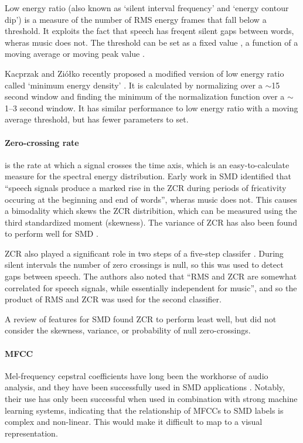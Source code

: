 Low energy ratio (also known as `silent interval frequency' and `energy contour
dip') is a measure of the number of RMS energy frames that fall below a
threshold. It exploits the fact that speech has freqent silent gaps between
words, wheras music does not. The threshold can be set as a fixed value
\citep{Liang2005}, a function of a moving average \citep{Ericsson2009} or moving
peak value \citep{Saunders1996}.

Kacprzak and Zi\'{o}\l{}ko recently proposed a modified version of low energy
ratio called `minimum energy density' \citep{Kacprzak2013}. It is calculated by
normalizing over a $\sim$15 second window and finding the minimum of the
normalization function over a $\sim$1--3 second window. It has similar
performance to low energy ratio with a moving average threshold, but has fewer
parameters to set.

\paragraph{Zero-crossing rate} is the rate at which a signal crosses the time
axis, which is an easy-to-calculate measure for the spectral energy
distribution. Early work in SMD \citep{Saunders1996} identified that ``speech
signals produce a marked rise in the ZCR during periods of fricativity occuring
at the beginning and end of words'', wheras music does not. This causes a
bimodality which skews the ZCR distribition, which can be measured using the
third standardized moment (skewness). The variance of ZCR has also been found
to perform well for SMD \citep{Scheirer1997}.

ZCR also played a significant role in two steps of a five-step classifer
\citep{Panagiotakis2005}. During silent intervals the number of zero crossings
is null, so this was used to detect gaps between speech. The authors also noted
that ``RMS and ZCR are somewhat correlated for speech signals, while
essentially independent for music'', and so the product of RMS and ZCR was used
for the second classifier.

A review \citep{Carey1999} of features for SMD found ZCR to perform least well,
but did not consider the skewness, variance, or probability of null
zero-crossings.

\paragraph{MFCC}
Mel-frequency cepstral coefficients have long been the workhorse of audio
analysis, and they have been successfully used in SMD applications
\citep{Carey1999,Liang2005,Pikrakis2008,Pikrakis2006a,Sell2014,Wieser2014}.
Notably, their use has only been successful when used in combination with
strong machine learning systems, indicating that the relationship of MFCCs to
SMD labels is complex and non-linear. This would make it difficult to map to a
visual representation.

